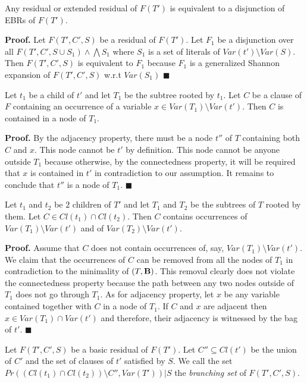 \documentclass{llncs}
\begin{document}
\begin{lemma} \label{localdisj}
Any residual or extended residual of $F(T')$ is equivalent to a disjunction of EBRs of $F(T')$. 
\end{lemma}
 
{\bf Proof.}
Let $F(T',C',S)$ be a residual of $F(T')$.
Let $F_1$ be a disjunction over all $F(T',C',S \cup S_1) \wedge \bigwedge S_1$ where $S_1$ is a set
of literals of $Var(t') \setminus Var(S)$. Then $F(T',C',S)$ is equivalent to $F_1$ because $F_1$
is a generalized Shannon expansion of $F(T',C',S)$ w.r.t $Var(S_1)$ 
$\blacksquare$


\begin{lemma} \label{unnode}
Let $t_1$ be a child of $t'$ and let $T_1$ be the subtree rooted by $t_1$.
Let $C$ be a clause of $F$ containing an occurrence of a variable $x \in Var(T_1) \setminus Var(t')$.
Then $C$ is contained in a node of $T_1$.
\end{lemma}

{\bf Proof.}
By the adjacency property, there must be a node $t''$ of $T$ containing both $C$ and $x$.
This node cannot be $t'$ by definition. This node cannot be anyone outside $T_1$ because
otherwise, by the connectedness property, it will be required that $x$ is contained in
$t'$ in contradiction to our assumption. It remains to conclude that $t''$ is a node
of $T_1$. $\blacksquare$

\begin{lemma} \label{unclause}
Let $t_1$ and $t_2$ be $2$ children of $T'$ and let $T_1$ and $T_2$ be the
subtrees of $T$ rooted by them. Let $C \in Cl(t_1) \cap Cl(t_2)$.
Then $C$ contains occurrences of $Var(T_1) \setminus Var(t')$ and
of $Var(T_2) \setminus Var(t')$.
\end{lemma}

{\bf Proof.}
Assume that $C$ does not contain occurrences of, say, $Var(T_1) \setminus Var(t')$.
We claim that the occurrences of $C$ can be removed from all the nodes of $T_1$
in contradiction to the minimality of $(T,{\bf B})$. This removal clearly does not
violate the connectedness property because the path between any two nodes outside
of $T_1$ does not go through $T_1$. As for adjacency property, let $x$ be any variable
contained together with $C$ in a node of $T_1$. 
If $C$ and $x$ are adjacent then $x \in Var(T_1) \cap Var(t')$ and therefore,
their adjacency is witnessed by the bag of $t'$. $\blacksquare$

Let $F(T',C',S)$ be a basic residual of $F(T')$.
Let $C'' \subseteq Cl(t')$ be the union of $C'$ and the set of clauses of $t'$ satisfied 
by $S$. We call the set $Pr((Cl(t_1) \cap Cl(t_2)) \setminus C'',Var(T'))|S$ the \emph{branching set}
of $F(T',C',S)$.
\end{document}
